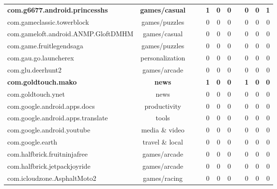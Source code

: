 \begin{table*}
\begin{small}
\begin{center}
{\begin{tabular}{|l|c|c||c|c|c|c||c|c|c|c|}
{\bf com.g6677.android.princesshs       		   }&{\bf       games/casual       }&{\bf            }&{\bf            }&{\bf      1      }&{\bf      0      }&{\bf      0      }&{\bf      \checkmark      }&{\bf      0      }&{\bf      0      }&{\bf      1      }\\
com.gameclassic.towerblock       					&       games/puzzles       &      \checkmark      &            &0&0&0&      \checkmark      &0&0&0\\
com.gameloft.android.ANMP.GloftDMHM       			&       games/casual       &            &            &0&0&0&            &0&0&0\\
com.game.fruitlegendsaga       						&       games/puzzles       &            &            &0&0&0&            &0&0&0\\
com.gau.go.launcherex       						&       personalization       &            &            &0&0&0&            &0&0&0\\
com.glu.deerhunt2       							&       games/arcade       &            &      \checkmark      &0&0&0&      \checkmark      &0&0&0\\
{\bf com.goldtouch.mako       					   }&{\bf       news       }&{\bf      \checkmark      }&{\bf            }&{\bf      1      }&{\bf      0      }&{\bf      0      }&{\bf            }&{\bf      1      }&{\bf      0      }&{\bf      0      }\\
com.goldtouch.ynet       							&       news       &      \checkmark      &            &0&0&0&            &0&0&0\\
com.google.android.apps.docs       					&       productivity       &            &            &0&0&0&            &0&0&0\\
com.google.android.apps.translate       			&       tools       &            &            &0&0&0&            &0&0&0\\
com.google.android.youtube       					&       media \& video      &            &            &0&0&0&            &0&0&0\\
com.google.earth       								&       travel \& local      &            &      \checkmark      &0&0&0&      \checkmark      &0&0&0\\
com.halfbrick.fruitninjafree       					&       games/arcade       &            &            &0&0&0&            &0&0&0\\
com.halfbrick.jetpackjoyride       					&       games/arcade       &      \checkmark      &            &0&0&0&            &0&0&0\\
com.icloudzone.AsphaltMoto2       					&       games/racing       &            &            &0&0&0&      \checkmark      &0&0&0\\

\end{tabular}}
\end{center}
\end{small}
\end{table*}
